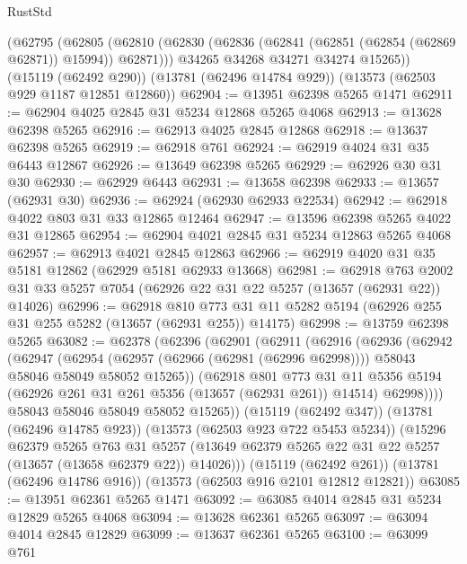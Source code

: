 \begin{lexlean}{RustStd}
\begin{coremodule}
    (@62795
      (@62805
        (@62810 (@62830 (@62836 (@62841 (@62851 (@62854 (@62869 @62871)) @15994)) @62871)))
        @34265
        @34268
        @34271
        @34274
        @15265))
    (@15119 (@62492 @290))
    (@13781 (@62496 @14784 @929))
    (@13573 (@62503 @929 @1187 @12851 @12860))
@62904 := @13951 @62398 @5265 @1471
@62911 := @62904 @4025 @2845 @31 @5234 @12868 @5265 @4068
@62913 := @13628 @62398 @5265
@62916 := @62913 @4025 @2845 @12868
@62918 := @13637 @62398 @5265
@62919 := @62918 @761
@62924 := @62919 @4024 @31 @35 @6443 @12867
@62926 := @13649 @62398 @5265
@62929 := @62926 @30 @31 @30
@62930 := @62929 @6443
@62931 := @13658 @62398
@62933 := @13657 (@62931 @30)
@62936 := @62924 (@62930 @62933 @22534)
@62942 := @62918 @4022 @803 @31 @33 @12865 @12464
@62947 := @13596 @62398 @5265 @4022 @31 @12865
@62954 := @62904 @4021 @2845 @31 @5234 @12863 @5265 @4068
@62957 := @62913 @4021 @2845 @12863
@62966 := @62919 @4020 @31 @35 @5181 @12862 (@62929 @5181 @62933 @13668)
@62981 := @62918
    @763
    @2002
    @31
    @33
    @5257
    @7054
    (@62926 @22 @31 @22 @5257 (@13657 (@62931 @22)) @14026)
@62996 := @62918
    @810
    @773
    @31
    @11
    @5282
    @5194
    (@62926 @255 @31 @255 @5282 (@13657 (@62931 @255)) @14175)
@62998 := @13759 @62398 @5265
@63082 := @62378
    (@62396
      (@62901
        (@62911
          (@62916
            (@62936
              (@62942
                (@62947
                  (@62954
                    (@62957 (@62966 (@62981 (@62996 @62998))))
                    @58043
                    @58046
                    @58049
                    @58052
                    @15265))
                (@62918
                  @801
                  @773
                  @31
                  @11
                  @5356
                  @5194
                  (@62926 @261 @31 @261 @5356 (@13657 (@62931 @261)) @14514)
                  @62998))))
          @58043
          @58046
          @58049
          @58052
          @15265))
      (@15119 (@62492 @347))
      (@13781 (@62496 @14785 @923))
      (@13573 (@62503 @923 @722 @5453 @5234))
      (@15296
        @62379
        @5265
        @763
        @31
        @5257
        (@13649 @62379 @5265 @22 @31 @22 @5257 (@13657 (@13658 @62379 @22)) @14026)))
    (@15119 (@62492 @261))
    (@13781 (@62496 @14786 @916))
    (@13573 (@62503 @916 @2101 @12812 @12821))
@63085 := @13951 @62361 @5265 @1471
@63092 := @63085 @4014 @2845 @31 @5234 @12829 @5265 @4068
@63094 := @13628 @62361 @5265
@63097 := @63094 @4014 @2845 @12829
@63099 := @13637 @62361 @5265
@63100 := @63099 @761

\end{coremodule}
\end{lexlean}
